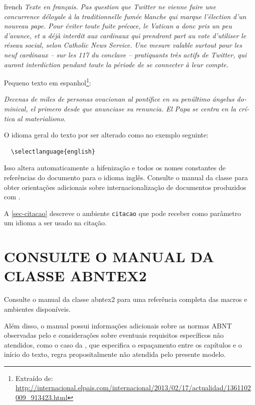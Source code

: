 \begin{otherlanguage*}{french}
\textit{Texte en français. Pas question que Twitter ne vienne faire une
concurrence déloyale à la traditionnelle fumée blanche qui marque l'élection
d'un nouveau pape. Pour éviter toute fuite précoce, le Vatican a donc pris un
peu d'avance, et a déjà interdit aux cardinaux qui prendront part au vote
d'utiliser le réseau social, selon Catholic News Service. Une mesure valable
surtout pour les neuf cardinaux – sur les 117 du conclave – pratiquants très
actifs de Twitter, qui auront interdiction pendant toute la période de se
connecter à leur compte.}
\end{otherlanguage*}

Pequeno texto em espanhol\footnote{Extraído de:
\url{http://internacional.elpais.com/internacional/2013/02/17/actualidad/1361102009_913423.html}}:

\foreignlanguage{spanish}{\textit{Decenas de miles de personas ovacionan al pontífice en su
penúltimo ángelus dominical, el primero desde que anunciase su renuncia. El Papa se
centra en la crítica al materialismo}}.

O idioma geral do texto por ser alterado como no exemplo seguinte:

\begin{verbatim}
  \selectlanguage{english}
\end{verbatim}

Isso altera automaticamente a hifenização e todos os nomes constantes de
referências do documento para o idioma inglês. Consulte o manual da classe
\cite{abntex2classe} para obter orientações adicionais sobre internacionalização de
documentos produzidos com \abnTeX.

A \autoref{sec-citacao} descreve o ambiente \texttt{citacao} que pode receber
como parâmetro um idioma a ser usado na citação.

\section{\uppercase{Consulte o manual da classe \textsf{abntex2}}}

Consulte o manual da classe \textsf{abntex2} \cite{abntex2classe} para uma
referência completa das macros e ambientes disponíveis. 

Além disso, o manual possui informações adicionais sobre as normas ABNT
observadas pelo \abnTeX e considerações sobre eventuais requisitos específicos
não atendidos, como o caso da , que
especifica o espaçamento entre os capítulos e o início do texto, regra
propositalmente não atendida pelo presente modelo.

